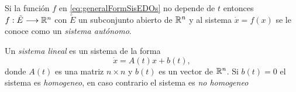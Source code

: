     Si la función $f$ en \eqref{eq:generalFormSisEDOs} no depende de $t$ entonces $f:\tilde{E} \longrightarrow {\mathbb{R}}^{n}$ con $\tilde{E}$ un subconjunto abierto de ${\mathbb{R}}^{n}$ y al sistema $\dot{x} = f(x)$ se le conoce como un \textit{sistema autónomo}.
    
    Un \textit{sistema lineal} es un sistema de la forma
    \begin{equation}
    	\dot{x} = A(t)x + b(t),
    \end{equation}
    donde $A(t)$ es una matriz $n \times n$ y $b(t)$ es un vector de ${\mathbb{R}}^{n}$. Si $b(t) = 0$ el sistema es \textit{homogeneo}, en caso contrario el sistema es \textit{no homogeneo}
    
   
